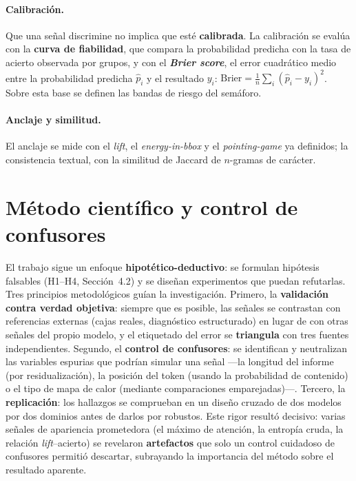 \paragraph{Calibración.} Que una señal discrimine no implica que esté \textbf{calibrada}. La
calibración se evalúa con la \textbf{curva de fiabilidad}, que compara la probabilidad predicha con la
tasa de acierto observada por grupos, y con el \textbf{\textit{Brier score}}, el error cuadrático medio
entre la probabilidad predicha $\hat{p}_i$ y el resultado $y_i$:
$\mathrm{Brier}=\frac{1}{n}\sum_i (\hat{p}_i - y_i)^2$. Sobre esta base se definen las bandas de riesgo
del semáforo.

\paragraph{Anclaje y similitud.} El anclaje se mide con el \textit{lift}, el \textit{energy-in-bbox} y
el \textit{pointing-game} ya definidos; la consistencia textual, con la similitud de Jaccard de
$n$-gramas de carácter.

\section{Método científico y control de confusores}
El trabajo sigue un enfoque \textbf{hipotético-deductivo}: se formulan hipótesis falsables (H1--H4,
Sección~4.2) y se diseñan experimentos que puedan refutarlas. Tres principios metodológicos guían la
investigación. Primero, la \textbf{validación contra verdad objetiva}: siempre que es posible, las
señales se contrastan con referencias externas (cajas reales, diagnóstico estructurado) en lugar de con
otras señales del propio modelo, y el etiquetado del error se \textbf{triangula} con tres fuentes
independientes. Segundo, el \textbf{control de confusores}: se identifican y neutralizan las variables
espurias que podrían simular una señal —la longitud del informe (por residualización), la posición del
token (usando la probabilidad de contenido) o el tipo de mapa de calor (mediante comparaciones
emparejadas)—. Tercero, la \textbf{replicación}: los hallazgos se comprueban en un diseño cruzado de dos
modelos por dos dominios antes de darlos por robustos. Este rigor resultó decisivo: varias señales de
apariencia prometedora (el máximo de atención, la entropía cruda, la relación \emph{lift}--acierto) se
revelaron \textbf{artefactos} que solo un control cuidadoso de confusores permitió descartar,
subrayando la importancia del método sobre el resultado aparente.

